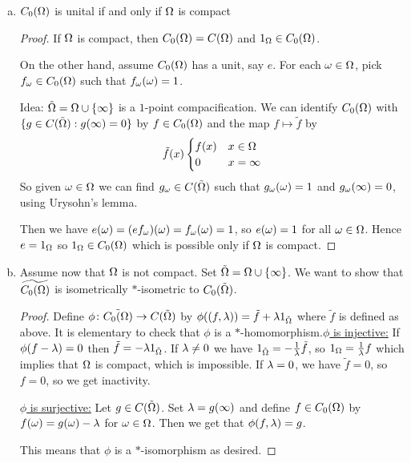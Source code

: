 \documentclass[10pt,english,a4paper]{article}
\theoremstyle{definition}
\newcommand{\wt}[1]{\widetilde{ #1 }}
\begin{document}
\begin{enumerate}[(a)]
    \item $C_0(\Omega)$ is unital if and only if $\Omega$ is compact

    \begin{proof}
        If $\Omega$ is compact, then $C_0 (\Omega) = C(\Omega)$ and $1_{\Omega} \in C_0(\Omega)$.

        On the other hand, assume $C_0(\Omega)$ has a unit, say $e$. For each $\omega \in \Omega$,
        pick $f_{\omega} \in C_0 (\Omega)$ such that $f_{\omega}(\omega) = 1$.
   
        Idea: $\tilde{\Omega} = \Omega \cup \{\infty\}$ is a $1$-point compacification. We can identify
        $C_0(\Omega)$ with $\{ g \in C(\tilde{\Omega}) : g(\infty) =0 \}$ by $f \in C_{0}(\Omega)$
        and the map $f \mapsto \tilde{f}$ by 
    \[\tilde{f} (x) \begin{cases} f(x) & x \in \Omega \\ 0 & x =\infty \end{cases} \]
    So given $\omega \in \Omega$ we can find $g_{\omega} \in C(\tilde{\Omega})$ such that 
    $g_{\omega}(\omega)= 1$ and $g_{\omega}(\infty) = 0$, using Urysohn's lemma.
    
    Then we have $e(\omega) = (ef_{\omega})(\omega) = f_{\omega}(\omega)= 1$, so $e(\omega)=1$ 
    for all $\omega \in \Omega$. Hence $e = 1_{\Omega}$ so $1_{\Omega} \in C_0(\Omega)$
    which is possible only if $\Omega$ is compact. 
\end{proof}


\item 
    Assume now that $\Omega$ is not compact. Set $\tilde{\Omega} = \Omega\cup\{\infty\}$.
    We want to show that $\wt{C_0(\Om)}$ is isometrically $*$-isometric to
    $C_0(\tilde{\Omega})$. 



\begin{proof}
    Define $\phi\colon \tilde{C_0(\Omega)} \to C(\tilde{\Omega})$ by 
    $\phi((f,\lambda)) = \tilde{f} + \lambda 1_{\tilde{\Omega}}$ where 
    $\tilde{f}$ is defined as above. It is elementary to check that 
    $\phi$ is a $*$-homomorphism.\ul{$\phi$ is injective:}
    If $\phi(f-\lambda) = 0$ then $\tilde{f} = -\lambda 1_{\tilde{\Omega}}$. If 
    $\lambda \neq 0$ we have $1_{\tilde{\Omega}} = -\frac{1}{\lambda} \tilde{f}$, so 
    $1_{\Omega} = \frac{1}{\lambda}f$
    which implies that $\Omega$ is compact, which is impossible. If $\lambda =0$, 
    we have $\tilde{f} =0$, so $f = 0$, so we get inactivity.

    \ul{$\phi$ is surjective:} Let $g \in C(\tilde{\Omega})$. Set $\lambda = g(\infty)$ 
     and define $f \in C_0(\Omega)$ by $f(\omega) = g(\omega)-\lambda$ for $\omega \in \Omega$.
    Then we get that $\phi(f,\lambda) = g$. 

    This means that $\phi$ is a $*$-isomorphism as desired. 


\end{proof}


\end{enumerate}
\end{document}
